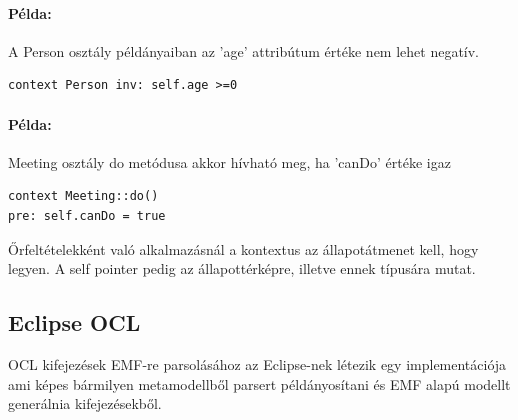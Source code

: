 \paragraph{Példa:} A Person osztály példányaiban az 'age' attribútum értéke nem lehet negatív.

\begin{lstlisting}[language=OCL,frame=single]
	context Person inv: self.age >=0
\end{lstlisting}

\paragraph{Példa:}  Meeting osztály do metódusa akkor hívható meg, ha 'canDo' értéke igaz
\begin{lstlisting}[language=OCL,frame=single]
context Meeting::do()
pre: self.canDo = true
\end{lstlisting}

Őrfeltételekként való alkalmazásnál a kontextus az állapotátmenet kell, hogy legyen. A self pointer pedig az állapottérképre, illetve ennek típusára mutat.

\subsection{Eclipse OCL}

OCL kifejezések EMF-re parsolásához az Eclipse-nek létezik egy implementációja ami képes bármilyen metamodellből parsert példányosítani és EMF alapú modellt generálnia kifejezésekből.


